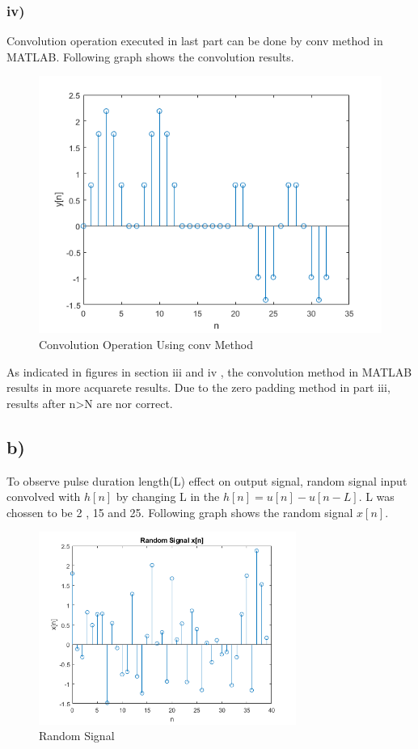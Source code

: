 \documentclass[letterpaper,12pt]{article}
\begin{document}
\subsubsection{iv)}
Convolution operation executed in last part can be done by conv method in MATLAB. Following graph shows the convolution results. 
\begin{figure}[H]
    \centering
    \includegraphics[width = 1\textwidth]{i4.png}
    \caption{Convolution Operation Using conv Method}
    \end{figure} 
    As indicated in figures in section iii and iv , the convolution method in MATLAB results in more acquarete results. Due to the zero padding method in part iii, results after n>N are nor correct.


\subsection{b)}
To observe pulse duration length(L) effect on output signal, random signal input convolved with \(h[n]\) by changing L in the \(h[n] = u[n] - u[n-L]\). L was chossen to be 2 , 15 and 25.
Following graph shows the random signal \(x[n]\).
\begin{figure}[H]
    \centering
    \includegraphics[width = 0.75\textwidth]{b_signal.png}
    \caption{Random Signal}
    \end{figure} 
\end{document}
